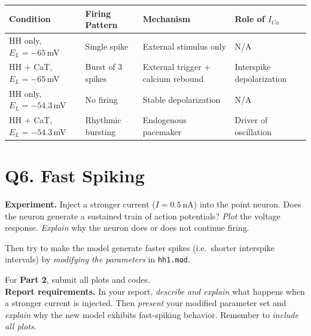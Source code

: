 \documentclass{article}
\begin{document}
\begin{answerbox}
\vspace{1em}
\begin{center}
    \label{tab:q5_summary}
    \begin{tabular}{@{}p{3.5cm}p{3cm}p{4cm}p{3cm}@{}}
    \toprule
    \textbf{Condition} & \textbf{Firing Pattern} & \textbf{Mechanism} & \textbf{Role of $I_{Ca}$} \\
    \midrule
    HH only, $E_L = -65\,$mV & Single spike & External stimulus only & N/A \\
    HH + CaT, $E_L = -65\,$mV & Burst of 3 spikes & External trigger + calcium rebound & Interspike depolarization \\
    HH only, $E_L = -54.3\,$mV & No firing & Stable depolarization & N/A \\
    HH + CaT, $E_L = -54.3\,$mV & Rhythmic bursting & Endogenous pacemaker & Driver of oscillation \\
    \bottomrule
    \end{tabular}
\end{center}
\end{answerbox}

\clearpage

\section*{\textbf{Q6.} Fast Spiking}

\noindent\textbf{Experiment.}
Inject a stronger current ($I=\SI{0.5}{\nano\ampere}$) into the point neuron. 
Does the neuron generate a sustained train of action potentials?
\textit{Plot} the voltage response.
\textit{Explain} why the neuron does or does not continue firing.

Then try to make the model generate faster spikes (i.e.\ shorter interspike intervals) by \textit{modifying the parameters} in \texttt{hh1.mod}.

For \textbf{Part 2}, submit all plots and codes.\\

\noindent\textbf{Report requirements.}
In your report, \textit{describe and explain} what happens when a stronger current is injected.
Then \textit{present} your modified parameter set and \textit{explain} why the new model exhibits fast-spiking behavior.
Remember to \textit{include all plots}.
\end{document}
